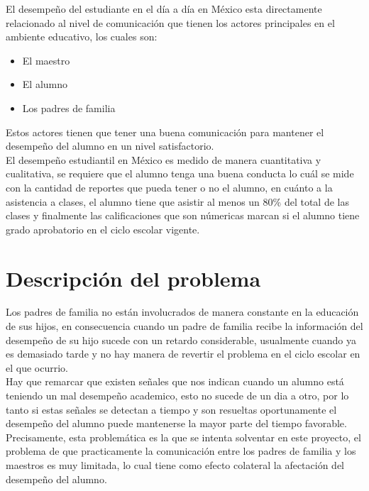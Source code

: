 
    El desempeño del estudiante en el día a día en México esta directamente relacionado al nivel de comunicación que tienen los actores principales en el ambiente educativo, los cuales son:
    
    \begin{itemize}
        \item El maestro
        \item El alumno
        \item Los padres de familia
    \end{itemize}
    
    Estos actores tienen que tener una buena comunicación para mantener el desempeño del alumno en un nivel satisfactorio. \\ El desempeño estudiantil en México es medido de manera cuantitativa y cualitativa, se requiere que el alumno tenga una buena conducta lo cuál se mide con la cantidad de reportes que pueda tener o no el alumno, en cuánto a la asistencia a clases, el alumno tiene que asistir al menos un 80\% del total de las clases y finalmente las calificaciones que son númericas marcan si el alumno tiene grado aprobatorio en el ciclo escolar vigente.


    \section{Descripción del problema} \label{descripcionproblema}
    
        Los padres de familia no están involucrados de manera constante en la educación de sus hijos, en consecuencia cuando un padre de familia recibe la información del desempeño de su hijo sucede con un retardo considerable, usualmente cuando ya es demasiado tarde y no hay manera de revertir el problema en el ciclo escolar en el que ocurrio. \\ Hay que remarcar que existen señales que nos indican cuando un alumno está teniendo un mal desempeño academico, esto no sucede de un dia a otro, por lo tanto si estas señales se detectan a tiempo y son resueltas oportunamente el desempeño del alumno puede mantenerse la mayor parte del tiempo favorable. \\ Precisamente, esta problemática es la que se intenta solventar en este proyecto, el problema de que practicamente la comunicación entre los padres de familia y los maestros es muy limitada, lo cual tiene como efecto colateral la afectación del desempeño del alumno.


